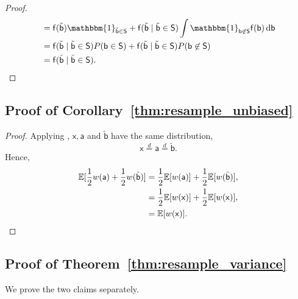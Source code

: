 \begin{proof}
\begin{align}
&= \mathsf{f}(\tilde{\mathsf{b}}) \mathbbm{1}_{\tilde{\mathsf{b}} \in \mathsf{S}}
        + \mathsf{f}(\tilde{\mathsf{b}} \mid \tilde{\mathsf{b}} \in \mathsf{S})
        \int \mathbbm{1}_{\mathsf{b} \not\in \mathsf{S}} \mathsf{f}(\mathsf{b}) \diff{\mathsf{b}} \\
&= \mathsf{f}(\tilde{\mathsf{b}} \mid \tilde{\mathsf{b}} \in \mathsf{S})
        P(\mathsf{b} \in \mathsf{S})
        + \mathsf{f}(\tilde{\mathsf{b}} \mid \tilde{\mathsf{b}} \in \mathsf{S})
        P(\mathsf{b} \not\in \mathsf{S}) \\
        &= \mathsf{f}(\tilde{\mathsf{b}} \mid \tilde{\mathsf{b}} \in \mathsf{S}).
    \end{align}
\end{proof}

\subsection{Proof of Corollary~\ref{thm:resample_unbiased}} \label{sec:proof:resample_unbiased}
\begin{proof}
    Applying , $\mathsf{x}, \mathsf{a}$ and $\tilde{\mathsf{b}}$ have the same distribution,
    \begin{equation}
        \mathsf{x} \stackrel{d}{=} \mathsf{a} \stackrel{d}{=} \tilde{\mathsf{b}}.
    \end{equation}
    Hence,
    \begin{align}
        \mathbb{E}[\frac{1}{2} w( \mathsf{a} ) + \frac{1}{2} w( \tilde{\mathsf{b}} )]
        &= \frac{1}{2} \mathbb{E}[ w( \mathsf{a} )] + \frac{1}{2} \mathbb{E}[ w( \tilde{\mathsf{b}} )], \\
        &= \frac{1}{2} \mathbb{E}[ w( \mathsf{x} )] + \frac{1}{2} \mathbb{E}[ w( \mathsf{x} )], \\
        &= \mathbb{E}[w( \mathsf{x} )].
    \end{align}
\end{proof}

\subsection{Proof of Theorem~\ref{thm:resample_variance}} \label{sec:proof:resample_variance}
We prove the two claims separately.

